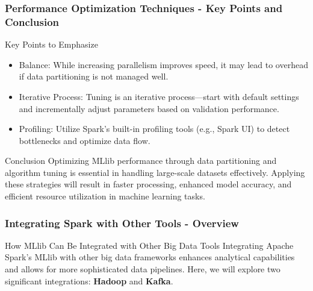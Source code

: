 \documentclass[aspectratio=169]{beamer}
\begin{document}
\begin{frame}[fragile]
    \frametitle{Performance Optimization Techniques - Key Points and Conclusion}
    \begin{block}{Key Points to Emphasize}
        \begin{itemize}
            \item Balance: While increasing parallelism improves speed, it may lead to overhead if data partitioning is not managed well.
            \item Iterative Process: Tuning is an iterative process—start with default settings and incrementally adjust parameters based on validation performance.
            \item Profiling: Utilize Spark's built-in profiling tools (e.g., Spark UI) to detect bottlenecks and optimize data flow.
        \end{itemize}
    \end{block}
    
    \begin{block}{Conclusion}
        Optimizing MLlib performance through data partitioning and algorithm tuning is essential in handling large-scale datasets effectively. 
        Applying these strategies will result in faster processing, enhanced model accuracy, and efficient resource utilization in machine learning tasks.
    \end{block}
\end{frame}

\begin{frame}[fragile]
    \frametitle{Integrating Spark with Other Tools - Overview}
    \begin{block}{How MLlib Can Be Integrated with Other Big Data Tools}
        Integrating Apache Spark's MLlib with other big data frameworks enhances analytical capabilities and allows for more sophisticated data pipelines. Here, we will explore two significant integrations: \textbf{Hadoop} and \textbf{Kafka}.
    \end{block}
\end{frame}
\end{document}
